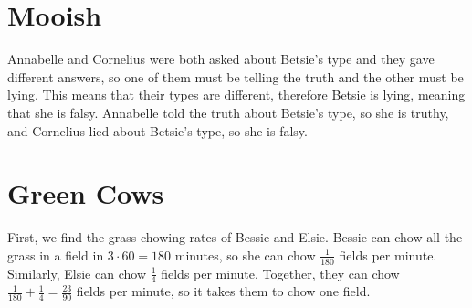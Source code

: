 \documentclass{article}
\begin{document}
\section*{Mooish}
Annabelle and Cornelius were both asked about Betsie's type and they gave different answers, so one of them must be telling the truth and the other must be lying.
This means that their types are different, therefore Betsie is lying, meaning that she is falsy.
Annabelle told the truth about Betsie's type, so she is truthy, and Cornelius lied about Betsie's type, so she is falsy.

\section*{Green Cows}
First, we find the grass chowing rates of Bessie and Elsie.
Bessie can chow all the grass in a field in $3 \cdot 60 = 180$ minutes, so she can chow $\frac{1}{180}$ fields per minute.
Similarly, Elsie can chow $\frac{1}{4}$ fields per minute.
Together, they can chow $\frac{1}{180} + \frac{1}{4} = \frac{23}{90}$ fields per minute, so it takes them  to chow one field.
\end{document}
